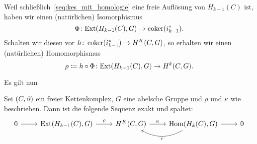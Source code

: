 \begin{vorbereitung}
  Weil schließlich~\eqref{seq:kes_mit_homologie} eine freie Auflösung von $H_{k-1}(C)$ ist, haben wir einen (natürlichen) Isomorphismus
  \begin{equation*}
    \Phi\colon \mathrm{Ext}(H_{k-1}(C),G) \to \operatorname{coker}(i_{k-1}^*).
  \end{equation*}
  Schalten wir diesen vor $h \colon \operatorname{coker}(i_{k-1}^*) \to H^K(C,G)$, so erhalten wir einen (natürlichen) Homomorphismus
  \begin{equation*}
    \rho \coloneqq h \circ \Phi \colon \mathrm{Ext}(H_{k-1}(C),G) \to H^k(C,G).
  \end{equation*}
\end{vorbereitung}
Es gilt nun
\begin{satz}
  Sei $(C,\partial)$ ein freier Kettenkomplex, $G$ eine abelsche Gruppe und $\rho$ und $\kappa$ wie beschrieben.
  Dann ist die folgende Sequenz exakt und spaltet:
  \begin{equation*}
    \begin{tikzcd}
      0 \arrow{r}{}
      & \Ext(H_{k-1}(C),G) \arrow{r}{\rho}
      & H^K(C,G) \arrow{r}{\kappa}
      & \Hom(H_k(C), G) \arrow{r}{} \arrow[bend left]{l}{r}
      & 0
    \end{tikzcd}
  \end{equation*}
\end{satz}
